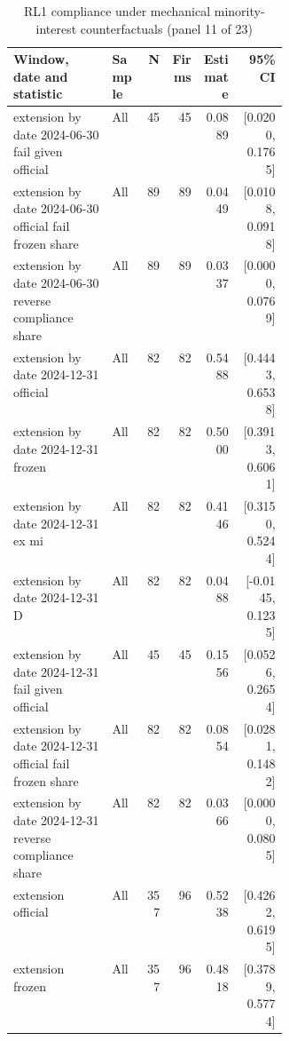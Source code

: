 \begin{table}[!htbp]\centering\scriptsize
\caption{RL1 compliance under mechanical minority-interest counterfactuals (panel 11 of 23)}
\begin{threeparttable}
\begin{tabular}{p{0.36\linewidth}lrrrr}
\toprule
Window, date and statistic & Sample & N & Firms & Estimate & 95\% CI \\
\midrule
extension by date 2024-06-30 fail given official & All & 45 & 45 & 0.0889 & [0.0200, 0.1765] \\
extension by date 2024-06-30 official fail frozen share & All & 89 & 89 & 0.0449 & [0.0108, 0.0918] \\
extension by date 2024-06-30 reverse compliance share & All & 89 & 89 & 0.0337 & [0.0000, 0.0769] \\
extension by date 2024-12-31 official & All & 82 & 82 & 0.5488 & [0.4443, 0.6538] \\
extension by date 2024-12-31 frozen & All & 82 & 82 & 0.5000 & [0.3913, 0.6061] \\
extension by date 2024-12-31 ex mi & All & 82 & 82 & 0.4146 & [0.3150, 0.5244] \\
extension by date 2024-12-31 D & All & 82 & 82 & 0.0488 & [-0.0145, 0.1235] \\
extension by date 2024-12-31 fail given official & All & 45 & 45 & 0.1556 & [0.0526, 0.2654] \\
extension by date 2024-12-31 official fail frozen share & All & 82 & 82 & 0.0854 & [0.0281, 0.1482] \\
extension by date 2024-12-31 reverse compliance share & All & 82 & 82 & 0.0366 & [0.0000, 0.0805] \\
extension  official & All & 357 & 96 & 0.5238 & [0.4262, 0.6195] \\
extension  frozen & All & 357 & 96 & 0.4818 & [0.3789, 0.5774] \\
\bottomrule
\end{tabular}
\begin{tablenotes}[flushleft]\footnotesize

\end{tablenotes}
\end{threeparttable}
\end{table}
